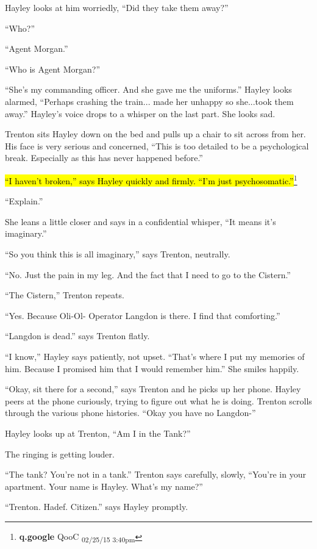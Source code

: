 Hayley looks at him worriedly, ``Did they take them away?''

``Who?''

``Agent Morgan.''

``Who is Agent Morgan?''

``She's my commanding officer.  And she gave me the uniforms.''  Hayley looks alarmed, ``Perhaps crashing the train... made her unhappy so she...took them away.'' Hayley's voice drops to a whisper on the last part.  She looks sad.



Trenton sits Hayley down on the bed and pulls up a chair to sit across from her.  His face is very serious and concerned, ``This is too detailed to be a psychological break.  Especially as this has never happened before.''

\hl{``I haven't broken,'' says Hayley quickly and firmly.  ``I'm just psychosomatic.''}\footnote{\textbf{q.google }QooC \textsubscript{02/25/15 3:40pm}}

``Explain.''

She leans a little closer and says in a confidential whisper, ``It means it's imaginary.''

``So you think this is all imaginary,'' says Trenton, neutrally.

``No.  Just the pain in my leg.  And the fact that I need to go to the Cistern.''

``The Cistern,'' Trenton repeats.

``Yes. Because Oli-Ol- Operator Langdon is there.  I find that comforting.''

``Langdon is dead.'' says Trenton flatly.

``I know,'' Hayley says patiently, not upset.  ``That's where I put my memories of him.  Because I promised him that I would remember him.''  She smiles happily.

``Okay, sit there for a second,'' says Trenton and he picks up her phone.  Hayley peers at the phone curiously, trying to figure out what he is doing.  Trenton scrolls through the various phone histories.  ``Okay you have no Langdon-''

Hayley looks up at Trenton, ``Am I in the Tank?''

The ringing is getting louder.

``The tank?  You're not in a tank.''  Trenton says carefully, slowly, ``You're in your apartment.  Your name is Hayley.  What's my name?''

``Trenton. Hadef.  Citizen.'' says Hayley promptly.

